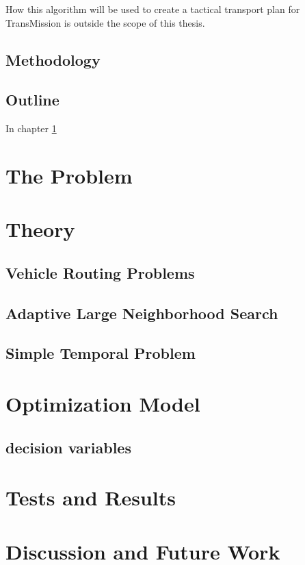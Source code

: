 \documentclass[a4paper]{article}
\begin{document}
How this algorithm will be used to create a tactical transport plan for TransMission is outside the scope of this thesis. 
\subsection{Methodology}

\subsection{Outline}
In chapter \ref{chap:The Problem}



\section{The Problem}
\label{chap:The Problem}
\section{Theory}
\label{chap:Theory}
\subsection{Vehicle Routing Problems}
\subsection{Adaptive Large Neighborhood Search}
\subsection{Simple Temporal Problem}
\section{Optimization Model}
\subsection{decision variables}
\label{chap:Optimization Model}
\section{Tests and Results}
\label{chap:Tests and Results}
\section{Discussion and Future Work}
\label{chap:Discussion and Future Work}

\newpage


\end{document}
